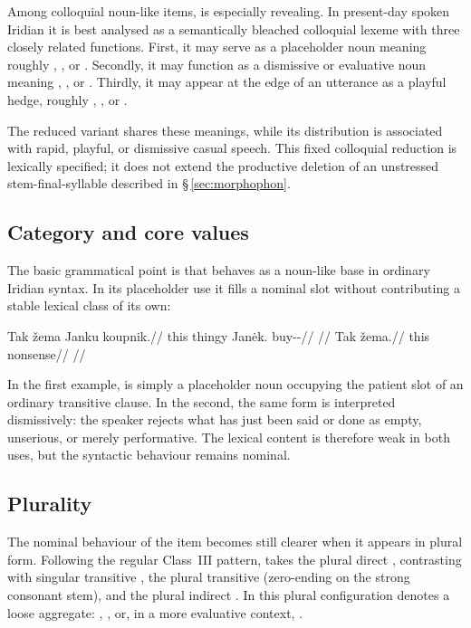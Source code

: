 Among colloquial noun-like items,  is especially revealing. In
present-day spoken Iridian it is best analysed as a semantically bleached
colloquial lexeme with three closely related functions. First, it may serve as
a placeholder noun meaning roughly , , or
. Secondly, it may function as a dismissive or
evaluative noun meaning , , or . Thirdly, it may appear at the edge of an utterance as a playful hedge,
roughly , , or .

The reduced variant  shares these meanings, while its distribution
is associated with rapid, playful, or dismissive casual speech. This fixed
colloquial reduction is lexically specified; it does not extend the productive
deletion of an unstressed stem-final-syllable  described in §\,\ref{sec:morphophon}.

\subsection{Category and core values}

The basic grammatical point is that  behaves as a noun-like base in
ordinary Iridian syntax. In its placeholder use it fills a nominal slot without
contributing a stable lexical class of its own:

\pex
\a
\begingl
\gla Tak žema Janku koupnik.//
\glb this thingy Janėk.\Trs{} buy-\Trs{}-\Pf{}//
\glft {}//
\endgl
\a
\begingl
\gla Tak žema.//
\glb this nonsense//
\glft {}//
\endgl
\xe

In the first example,  is simply a placeholder noun occupying the
patient slot of an ordinary transitive clause. In the second, the same form is
interpreted dismissively: the speaker rejects what has just been said or done as
empty, unserious, or merely performative. The lexical content is therefore weak
in both uses, but the syntactic behaviour remains nominal.

\subsection{Plurality}

The nominal behaviour of the item becomes still clearer when it appears in
plural form. Following the regular Class~III  pattern,
 takes the plural direct
, contrasting with singular transitive , the plural
transitive  (zero-ending on the strong consonant stem), and the
plural indirect . In this plural configuration  denotes a loose aggregate:
, , or, in a more evaluative
context, .


